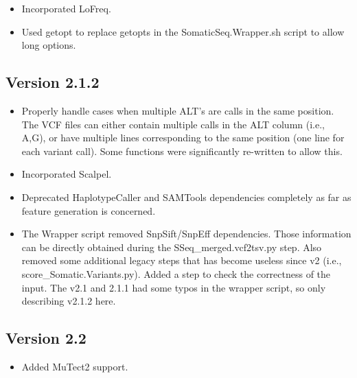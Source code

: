 \documentclass[10pt,letterpaper]{article}
\begin{document}
\begin{sloppypar}
\begin{itemize}
  \item
  Incorporated LoFreq.
  
  \item
  Used getopt to replace getopts in the SomaticSeq.Wrapper.sh script to allow long options. 
  
\end{itemize}



\subsection{Version 2.1.2}

\begin{itemize}

  \item
  Properly handle cases when multiple ALT's are calls in the same position. The VCF files can either contain multiple calls in the ALT column (i.e., A,G), or have multiple lines corresponding to the same position (one line for each variant call). Some functions were significantly re-written to allow this.

  \item
  Incorporated Scalpel.
  
  \item
  Deprecated HaplotypeCaller and SAMTools dependencies completely as far as feature generation is concerned.
  
  \item
  The Wrapper script removed SnpSift/SnpEff dependencies. Those information can be directly obtained during the SSeq\_merged.vcf2tsv.py step. Also removed some additional legacy steps that has become useless since v2 (i.e., score\_Somatic.Variants.py). Added a step to check the correctness of the input. The v2.1 and 2.1.1 had some typos in the wrapper script, so only describing v2.1.2 here.

\end{itemize}



\subsection{Version 2.2}

\begin{itemize}

  \item
  Added MuTect2 support.

\end{itemize}




\end{sloppypar}
\end{document}
